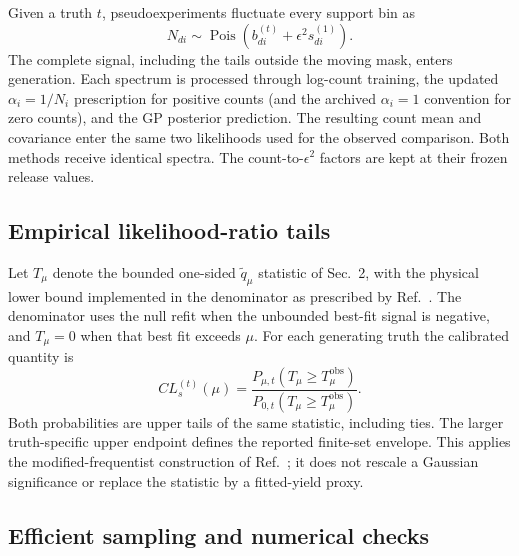 Given a truth $t$, pseudoexperiments fluctuate every support bin as
\begin{equation}
 N_{di}\sim\operatorname{Pois}\!\left(b^{(t)}_{di}
       +\epsilon^2 s^{(1)}_{di}\right).
\end{equation}
The complete signal, including the tails outside the moving mask, enters
generation. Each spectrum is processed through log-count training, the
updated $\alpha_i=1/N_i$ prescription for positive counts (and the archived
$\alpha_i=1$ convention for zero counts), and the GP posterior prediction.
The resulting count mean and covariance enter the same two likelihoods
used for the observed comparison. Both methods receive identical spectra.
The count-to-$\epsilon^2$ factors are kept at their frozen release values.

\subsection{Empirical likelihood-ratio tails}

Let $T_\mu$ denote the bounded one-sided $\widetilde q_\mu$ statistic of
Sec.~2, with the physical lower bound implemented in the denominator as prescribed
by Ref.~\cite{cowan}. The denominator uses the null refit when the unbounded
best-fit signal is negative, and $T_\mu=0$ when that best fit exceeds $\mu$. For each generating truth the calibrated quantity is
\begin{equation}
 CL_s^{(t)}(\mu)=
 \frac{P_{\mu,t}(T_\mu\ge T_\mu^{\mathrm{obs}})}
      {P_{0,t}(T_\mu\ge T_\mu^{\mathrm{obs}})}.
\end{equation}
Both probabilities are upper tails of the same statistic, including ties.
The larger truth-specific upper endpoint defines the reported finite-set
envelope. This applies the modified-frequentist construction of
Ref.~\cite{readcls}; it does not rescale a Gaussian significance or replace
the statistic by a fitted-yield proxy.

\clearpage
\subsection{Efficient sampling and numerical checks}

